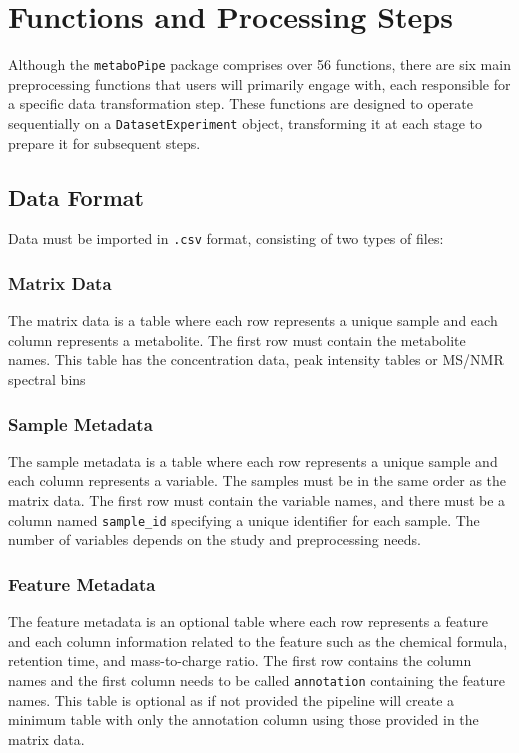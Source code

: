 \documentclass[ENG, BIB]{TFUOC}%
\begin{document}
\section{Functions and Processing Steps}

Although the \texttt{metaboPipe} package comprises over 56 functions, there are six main preprocessing functions that users will primarily engage with, each responsible for a specific data transformation step. These functions are designed to operate sequentially on a \texttt{DatasetExperiment} object, transforming it at each stage to prepare it for subsequent steps.
\subsection{Data Format}
Data must be imported in \texttt{.csv} format, consisting of two types of files:

\subsubsection{Matrix Data}
The matrix data is a table where each row represents a unique sample and each column represents a metabolite. The first row must contain the metabolite names. This table has the concentration data, peak intensity tables or MS/NMR spectral bins

\subsubsection{Sample Metadata}
The sample metadata is a table where each row represents a unique sample and each column represents a variable. The samples must be in the same order as the matrix data. The first row must contain the variable names, and there must be a column named \texttt{sample\_id} specifying a unique identifier for each sample. The number of variables depends on the study and preprocessing needs.

\subsubsection{Feature Metadata}
The feature metadata is an optional table where each row represents a feature and each column information related to the feature such as the chemical formula, retention time, and mass-to-charge ratio. The first row contains the column names and the first column needs to be called \texttt{annotation} containing the feature names. This table is optional as if not provided the pipeline will create a minimum table with only the annotation column using those provided in the matrix data.
\end{document}
